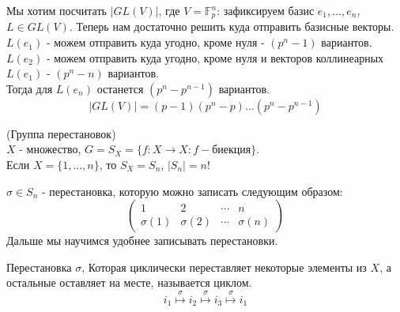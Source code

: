 \begin{example}
	Мы хотим посчитать $|GL(V)|$, где $V = \mathbb{F}_p^n$: зафиксируем базис $e_1, \dots, e_n$, $L \in GL(V)$.
 Теперь нам достаточно решить куда отправить базисные векторы. \\
	$L(e_1)$ - можем отправить куда угодно, кроме нуля - $\left(p^n - 1\right)$ вариантов. \\
	$L(e_2)$ - можем отправить куда угодно, кроме нуля и векторов коллинеарных $L(e_1)$ - $\left(p^n - n\right)$ вариантов. \\
	Тогда для $L(e_n)$ останется $\left(p^n - p^{n-1}\right)$ вариантов.
	$$|GL(V)| = \left(p - 1\right)\left(p^n - p\right)\dots\left(p^n - p^{n-1}\right)$$
\end{example}

\begin{definition}
	(Группа перестановок) \\ $X$ - множество, $G = S_X = \{f: X \to X: f - \text{биекция}\}$.\\ Если $X = \{1, \dots, n\}$,
 то $S_X = S_n$, $|S_n| = n!$
\end{definition}

\begin{definition}
	$\sigma \in S_n$ - перестановка, которую можно записать следующим образом:
	\[
		\begin{pmatrix}
			1 & 2 & \cdots & n \\
			\sigma(1) & \sigma(2) & \cdots & \sigma(n)
		\end{pmatrix}
	\]
	Дальше мы научимся удобнее записывать перестановки.
\end{definition}

\begin{definition}
	Перестановка $\sigma$, Которая циклически переставляет некоторые элементы из $X$, а остальные оставляет на месте,
 называется циклом.
	\[
	i_1 \overset{\sigma}{\mapsto} i_2 \overset{\sigma}{\mapsto} i_3 \overset{\sigma}{\mapsto} i_1
	\]
\end{definition}

